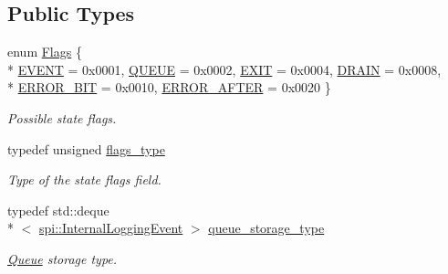\subsection*{Public Types}
\begin{DoxyCompactItemize}
\item 
enum \hyperlink{classlog4cplus_1_1thread_1_1Queue_a8807c511ce07e59b470ae6ab03d9c552}{Flags} \{ \\*
\hyperlink{classlog4cplus_1_1thread_1_1Queue_a8807c511ce07e59b470ae6ab03d9c552a8cd6e2c7fb55bdee1e33db59b311b231}{E\-V\-E\-N\-T} = 0x0001, 
\hyperlink{classlog4cplus_1_1thread_1_1Queue_a8807c511ce07e59b470ae6ab03d9c552a8c703f8c3780fcc3363bcbeb2b0ca5ee}{Q\-U\-E\-U\-E} = 0x0002, 
\hyperlink{classlog4cplus_1_1thread_1_1Queue_a8807c511ce07e59b470ae6ab03d9c552a984cebe781f208ef146a8eb9410bef97}{E\-X\-I\-T} = 0x0004, 
\hyperlink{classlog4cplus_1_1thread_1_1Queue_a8807c511ce07e59b470ae6ab03d9c552a09fd1ac15390a6e2064a197079019361}{D\-R\-A\-I\-N} = 0x0008, 
\\*
\hyperlink{classlog4cplus_1_1thread_1_1Queue_a8807c511ce07e59b470ae6ab03d9c552af17d1763534ece722b3236c48c2ec98d}{E\-R\-R\-O\-R\-\_\-\-B\-I\-T} = 0x0010, 
\hyperlink{classlog4cplus_1_1thread_1_1Queue_a8807c511ce07e59b470ae6ab03d9c552a71375dbff06326556925b992747a0f29}{E\-R\-R\-O\-R\-\_\-\-A\-F\-T\-E\-R} = 0x0020
 \}
\begin{DoxyCompactList}\small\item\em Possible state flags. \end{DoxyCompactList}\item 
typedef unsigned \hyperlink{classlog4cplus_1_1thread_1_1Queue_a6abff6eb8b4963c0ecf3e1ed67622490}{flags\-\_\-type}
\begin{DoxyCompactList}\small\item\em Type of the state flags field. \end{DoxyCompactList}\item 
typedef std\-::deque\\*
$<$ \hyperlink{classlog4cplus_1_1spi_1_1InternalLoggingEvent}{spi\-::\-Internal\-Logging\-Event} $>$ \hyperlink{classlog4cplus_1_1thread_1_1Queue_af9d2a870aac3a6cbf38e702bcc163741}{queue\-\_\-storage\-\_\-type}
\begin{DoxyCompactList}\small\item\em \hyperlink{classlog4cplus_1_1thread_1_1Queue}{Queue} storage type. \end{DoxyCompactList}\end{DoxyCompactItemize}
